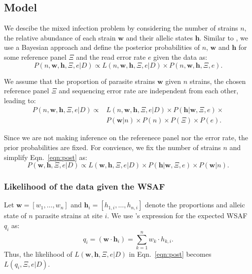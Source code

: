 \documentclass{bioinfo}
\begin{document}
\subsection{Model}
We descibe the mixed infection problem by considering the number of strains $n$, the relative abundance of each strain $\mathbf{w}$ and their allelic states $\mathbf{h}$. Similar to \citet{Jack2016}, we use a Bayesian approach and define the posterior probabilities of $n$, $\mathbf{w}$ and $\mathbf{h}$ for some reference panel $\Xi$ and the read error rate $e$ given the data as:
$$P(n, \mathbf{w}, \mathbf{h}, \Xi, e |D) \propto L(n, \mathbf{w}, \mathbf{h}, \Xi, e|D) \times P(n, \mathbf{w}, \mathbf{h}, \Xi, e).$$

We assume that the proportion of parasite strains $\mathbf{w}$ given $n$ strains, the chosen reference panel $\Xi$ and sequencing error rate are independent from each other, leading to:
\begin{equation}
\begin{split}
P(n, \mathbf{w}, \mathbf{h}, \Xi, e|D) \propto & L(n, \mathbf{w}, \mathbf{h}, \Xi, e | D) \times P(\mathbf{h}|\mathbf{w}, \Xi, e) \times \\
                                               & P(\mathbf{w}|n) \times P(n) \times P(\Xi) \times P(e).\label{eqn:post:old}
\end{split}
\end{equation}

Since we are not making inference on the referenece panel nor the error rate, the prior probabilities are fixed. For convience, we fix the number of strains $n$ and simplify Eqn.~\eqref{eqn:post} as:
\begin{equation}
P(\mathbf{w}, \mathbf{h}, \Xi, e |D) \propto L(\mathbf{w}, \mathbf{h}, \Xi, e|D) \times P(\mathbf{h}|\mathbf{w}, \Xi, e) \times P(\mathbf{w}|n). \label{eqn:post}
\end{equation}

\subsubsection{Likelihood of the data given the WSAF}
Let $\mathbf w = [w_1,\dots, w_n]$ and $\mathbf{h}_i = [h_{1,i},\dots,h_{n,i}]$ denote the proportions and alleic state of $n$ parasite strains at site $i$. We use \citet{Jack2016}'s expression for the expected WSAF $q_{i}$ as:
\begin{equation}
q_i= (\mathbf{w}\cdot\mathbf{h}_{i})  =  \sum_{k=1}^{n} w_k \cdot h_{k,i} .\label{eqn:qij_full_sum}
\end{equation}
Thus, the likelihood of $L(\mathbf{w}, \mathbf{h},\Xi, e|D)$ in Eqn.~\eqref{eqn:post} becomes $L(q_{i},\Xi, e|D)$. %
\end{document}

